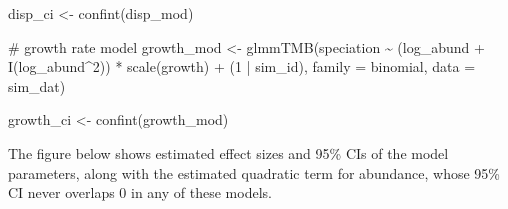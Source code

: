 \documentclass[
  letterpaper,
  DIV=11,
  numbers=noendperiod]{scrartcl}
\newenvironment{Shaded}{\begin{snugshade}}{\end{snugshade}}
\newcommand{\AttributeTok}[1]{\textcolor[rgb]{0.40,0.45,0.13}{#1}}
\newcommand{\CommentTok}[1]{\textcolor[rgb]{0.37,0.37,0.37}{#1}}
\newcommand{\DecValTok}[1]{\textcolor[rgb]{0.68,0.00,0.00}{#1}}
\newcommand{\FunctionTok}[1]{\textcolor[rgb]{0.28,0.35,0.67}{#1}}
\newcommand{\NormalTok}[1]{\textcolor[rgb]{0.00,0.23,0.31}{#1}}
\newcommand{\OtherTok}[1]{\textcolor[rgb]{0.00,0.23,0.31}{#1}}
\newcommand{\SpecialCharTok}[1]{\textcolor[rgb]{0.37,0.37,0.37}{#1}}
\begin{document}
\begin{Shaded}
\begin{Highlighting}[]
\NormalTok{disp\_ci }\OtherTok{\textless{}{-}} \FunctionTok{confint}\NormalTok{(disp\_mod)}

\CommentTok{\# growth rate model}
\NormalTok{growth\_mod }\OtherTok{\textless{}{-}} \FunctionTok{glmmTMB}\NormalTok{(speciation }\SpecialCharTok{\textasciitilde{}} 
\NormalTok{                          (log\_abund }\SpecialCharTok{+} \FunctionTok{I}\NormalTok{(log\_abund}\SpecialCharTok{\^{}}\DecValTok{2}\NormalTok{)) }\SpecialCharTok{*}
                          \FunctionTok{scale}\NormalTok{(growth) }\SpecialCharTok{+} 
\NormalTok{                          (}\DecValTok{1} \SpecialCharTok{|}\NormalTok{ sim\_id), }
                      \AttributeTok{family =}\NormalTok{ binomial, }\AttributeTok{data =}\NormalTok{ sim\_dat)}

\NormalTok{growth\_ci }\OtherTok{\textless{}{-}} \FunctionTok{confint}\NormalTok{(growth\_mod)}
\end{Highlighting}
\end{Shaded}

The figure below shows estimated effect sizes and 95\% CIs of the model
parameters, along with the estimated quadratic term for abundance, whose
95\% CI never overlaps 0 in any of these models.
\end{document}
